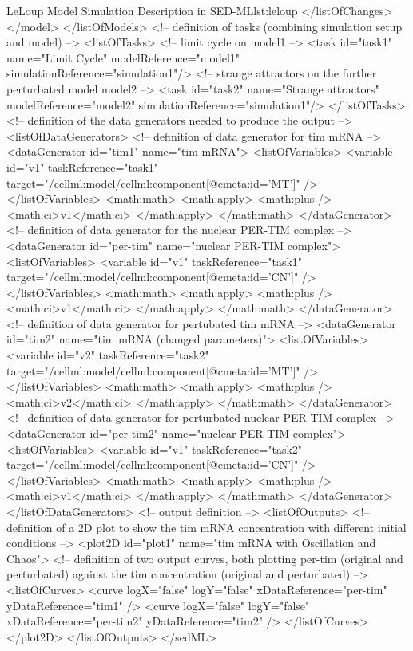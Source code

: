 \begin{myXmlLst}{LeLoup Model Simulation Description in SED-ML}{lst:leloup}
   </listOfChanges>
  </model>
 </listOfModels>
 <!-- definition of tasks (combining simulation setup and model) --> 
 <listOfTasks>
  <!-- limit cycle on model1 --> 
  <task id="task1" name="Limit Cycle" modelReference="model1" simulationReference="simulation1"/>
  <!-- strange attractors on the further perturbated model model2 -->
  <task id="task2" name="Strange attractors" modelReference="model2" simulationReference="simulation1"/>
 </listOfTasks>
 <!-- definition of the data generators needed to produce the output -->
 <listOfDataGenerators>
  <!-- definition of data generator for tim mRNA -->
  <dataGenerator id="tim1" name="tim mRNA">
   <listOfVariables>
    <variable id="v1" taskReference="task1" target="/cellml:model/cellml:component[@cmeta:id='MT']" />
   </listOfVariables>
   <math:math>
    <math:apply>
     <math:plus />
     <math:ci>v1</math:ci>
    </math:apply>
   </math:math>
  </dataGenerator>
  <!-- definition of data generator for the nuclear PER-TIM complex -->
  <dataGenerator id="per-tim" name="nuclear PER-TIM complex">
   <listOfVariables>
    <variable id="v1" taskReference="task1" target="/cellml:model/cellml:component[@cmeta:id='CN']" />
   </listOfVariables>
   <math:math>
    <math:apply>
     <math:plus />
     <math:ci>v1</math:ci>
    </math:apply>
   </math:math>
  </dataGenerator>
  <!-- definition of data generator for pertubated tim mRNA -->  
  <dataGenerator id="tim2" name="tim mRNA (changed parameters)">
   <listOfVariables>
    <variable id="v2" taskReference="task2" target="/cellml:model/cellml:component[@cmeta:id='MT']" />
   </listOfVariables>  
   <math:math>
    <math:apply>
     <math:plus />
     <math:ci>v2</math:ci>
    </math:apply>
   </math:math>
  </dataGenerator>
  <!-- definition of data generator for perturbated nuclear PER-TIM complex -->  
  <dataGenerator id="per-tim2" name="nuclear PER-TIM complex">
   <listOfVariables>
    <variable id="v1" taskReference="task2" target="/cellml:model/cellml:component[@cmeta:id='CN']" />
   </listOfVariables>
   <math:math>
    <math:apply>
     <math:plus />
     <math:ci>v1</math:ci>
    </math:apply>
   </math:math>
  </dataGenerator>
 </listOfDataGenerators>
 <!-- output definition --> 
  <listOfOutputs>
   <!-- definition of a 2D plot to show the tim mRNA concentration with different initial conditions -->
   <plot2D id="plot1" name="tim mRNA with Oscillation and Chaos">
    <!-- definition of two output curves, both plotting per-tim (original and perturbated) against the tim concentration (original and perturbated) -->
    <listOfCurves>
     <curve logX="false" logY="false" xDataReference="per-tim" yDataReference="tim1" />
     <curve logX="false" logY="false" xDataReference="per-tim2" yDataReference="tim2" />
    </listOfCurves>
   </plot2D>
  </listOfOutputs>
</sedML>
\end{myXmlLst}



